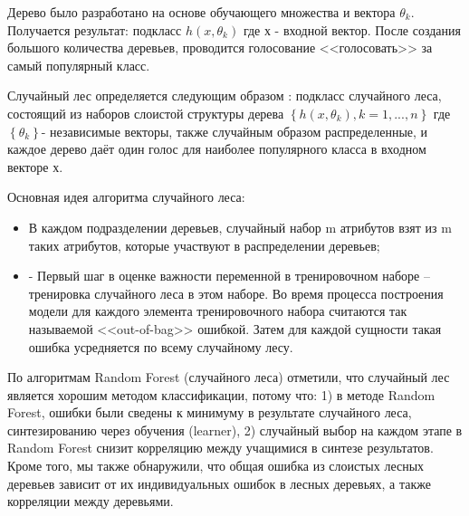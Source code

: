 Дерево было разработано на основе обучающего множества и вектора $\theta_k$. Получается результат: подкласс $h\left(x, \theta_k \right)$ где $х$ - входной вектор. После создания большого количества деревьев, проводится голосование <<голосовать>> за самый популярный класс.

Случайный лес определяется следующим образом \cite{Biggio2011}: подкласс случайного леса, состоящий из наборов слоистой структуры дерева $\left\{h\left(x,\theta_k\right), k=1, ...,n\right\}$ где $\left\{\theta_k\right\}$- независимые векторы, также случайным образом распределенные, и каждое дерево даёт один голос для наиболее популярного класса в входном векторе $х$.

Основная идея алгоритма случайного леса:

\begin{itemize}
	\item В каждом подразделении деревьев, случайный набор m атрибутов взят из m таких атрибутов, которые участвуют в распределении деревьев;
	\item -	Первый шаг в оценке важности переменной в тренировочном наборе – тренировка случайного леса в этом наборе. Во время процесса построения модели для каждого элемента тренировочного набора считаются так называемой <<out-of-bag>> ошибкой. Затем для каждой сущности такая ошибка усредняется по всему случайному лесу.
\end{itemize}

По алгоритмам Random Forest (случайного леса) отметили, что случайный лес является хорошим методом классификации, потому что: 1) в методе Random Forest, ошибки были сведены к минимуму в результате случайного леса, синтезированию через обучения (learner), 2) случайный выбор на каждом этапе в Random Forest снизит корреляцию между учащимися в синтезе результатов. Кроме того, мы также обнаружили, что общая ошибка из слоистых лесных деревьев зависит от их индивидуальных ошибок в лесных деревьях, а также корреляции между деревьями.